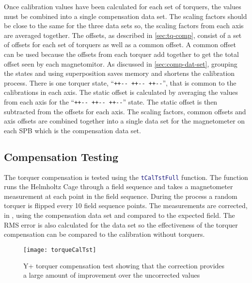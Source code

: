 Once calibration values have been calculated for each set of torquers, the values must be combined into a single compensation data set. The scaling factors should be close to the same for the three data sets so, the scaling factors from each axis are averaged together. The offsets, as described in \cref{sec:tq-comp}, consist of a set of offsets for each set of torquers as well as a common offset. A common offset can be used because the offsets from each torquer add together to get the total offset seen by each magnetomitor. As discussed in \cref{sec:comp-dat-set}, grouping the states and using superposition saves memory and shortens the calibration process. There is one torquer state, ``\texttt{++-{}- ++-{}- ++-{}-}'', that is common to the calibrations in each axis. The static offset is calculated by averaging the values from each axis for the ``\texttt{++-{}- ++-{}- ++-{}-}'' state. The static offset is then subtracted from the offsets for each axis. The scaling factors, common offsets and axis offsets are combined together into a single data set for the magnetometer on each \ac{SPB} which is the compensation data set.

\subsection{Compensation Testing}
\label{sec:tq-comp-tst}

The torquer compensation is tested using the \lstinline[style=code,language=Matlab]$tCalTstFull$ function. The function runs the Helmholtz Cage through a field sequence and takes a magnetometer measurement at each point in the field sequence. During the process a random torquer is flipped every 10 field sequence points. The measurements are corrected, in \matlab, using the compensation data set and compared to the expected field. The RMS error is also calculated for the data set so the effectiveness of the torquer compensation can be compared to the calibration without torquers.

\begin{figure}[!ht]
    \centering
    \texttt{[image: torqueCalTst]}
    \caption{Y+ torquer compensation test showing that the correction provides a large amount of improvement over the uncorrected values}
    \label{fig:tqtst}
\end{figure}

